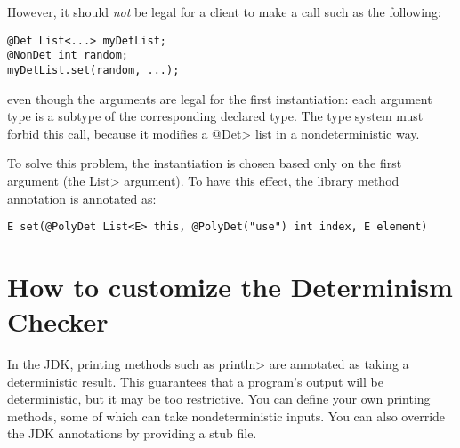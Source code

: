 \noindent
However, it should \emph{not} be legal for a client to make a call such as
the following:

\begin{Verbatim}
@Det List<...> myDetList;
@NonDet int random;
myDetList.set(random, ...);
\end{Verbatim}

\noindent
even though the arguments are legal for the first instantiation:
each argument type is a subtype of the corresponding declared type.
The type system must forbid this call, because it modifies a
\<@Det> list in a nondeterministic way.

To solve this problem, the instantiation is chosen based only on the first
argument (the \<List> argument).  To have this effect, the library method
annotation is annotated as:

\begin{Verbatim}
E set(@PolyDet List<E> this, @PolyDet("use") int index, E element)
\end{Verbatim}



\section{How to customize the Determinism Checker\label{determinism-customization}}

In the JDK, printing methods such as \<println> are annotated as taking a
deterministic result.  This guarantees that a program's output will be
deterministic, but it may be too restrictive.  You can define your own
printing methods, some of which can take nondeterministic inputs.  You can
also override the JDK annotations by providing a stub file.


